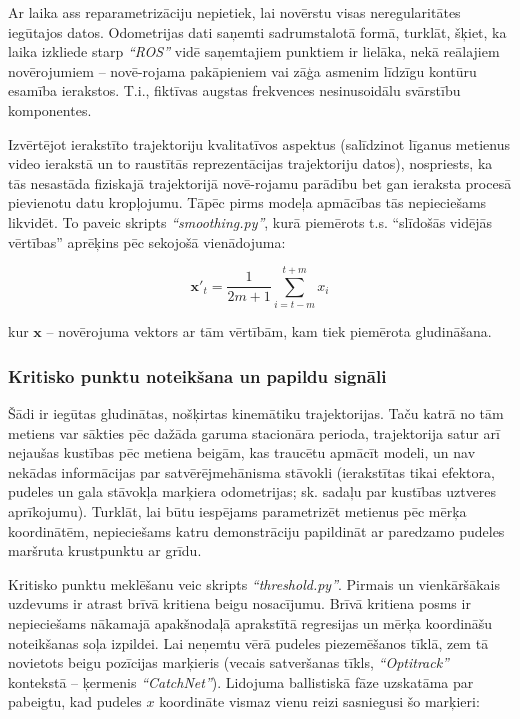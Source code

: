 \documentclass[12pt, a4paper]{article}
\numberwithin{equation}{section} %
\begin{document}
Ar laika ass reparametrizāciju nepietiek, lai novērstu visas neregularitātes iegūtajos datos. Odometrijas dati saņemti sadrumstalotā formā, turklāt, šķiet, ka laika izkliede starp \textit{``ROS''} vidē saņemtajiem punktiem ir lielāka, nekā reālajiem novērojumiem -- novē-rojama pakāpieniem vai zāģa asmenim līdzīgu kontūru esamība ierakstos. T.i., fiktīvas augstas frekvences nesinusoidālu svārstību komponentes. 

Izvērtējot ierakstīto trajektoriju kvalitatīvos aspektus (salīdzinot līganus metienus video ierakstā un to raustītās reprezentācijas trajektoriju datos), nospriests, ka tās nesastāda fiziskajā trajektorijā novē-rojamu parādību bet gan ieraksta procesā pievienotu datu kropļojumu. Tāpēc pirms modeļa apmācības tās nepieciešams likvidēt. To paveic skripts \textit{``smoothing.py''}, kurā piemērots t.s. ``slīdošās vidējās vērtības'' aprēķins pēc sekojošā vienādojuma:

\begin{equation}
     \boldsymbol{x}'_{t} = \frac{1}{2m+1} \sum_{i=t-m}^{t+m}  x_i
\end{equation}

kur $ \boldsymbol{x}$ -- novērojuma vektors ar tām vērtībām, kam tiek piemērota gludināšana.

\subsubsection{Kritisko punktu noteikšana un papildu signāli}

Šādi ir iegūtas gludinātas, nošķirtas kinemātiku trajektorijas. Taču katrā no tām metiens var sākties pēc dažāda garuma stacionāra perioda, trajektorija satur arī nejaušas kustības pēc metiena beigām, kas traucētu apmācīt modeli, un nav nekādas informācijas par satvērējmehānisma stāvokli (ierakstītas tikai efektora, pudeles un gala stāvokļa marķiera odometrijas; sk. sadaļu par kustības uztveres aprīkojumu). Turklāt, lai būtu iespējams parametrizēt metienus pēc mērķa koordinātēm, nepieciešams katru demonstrāciju papildināt ar paredzamo pudeles maršruta krustpunktu ar grīdu. 

Kritisko punktu meklēšanu veic skripts \textit{``threshold.py''}. Pirmais un vienkāršākais uzdevums ir atrast brīvā kritiena beigu nosacījumu. Brīvā kritiena posms ir nepieciešams nākamajā apakšnodaļā aprakstītā regresijas un mērķa koordināšu noteikšanas soļa izpildei. Lai neņemtu vērā pudeles piezemēšanos tīklā, zem tā novietots beigu pozīcijas marķieris (vecais satveršanas tīkls, \textit{``Optitrack''} kontekstā -- ķermenis \textit{``CatchNet''}). Lidojuma ballistiskā fāze uzskatāma par pabeigtu, kad pudeles $x$ koordināte vismaz vienu reizi sasniegusi šo marķieri:
\end{document}
